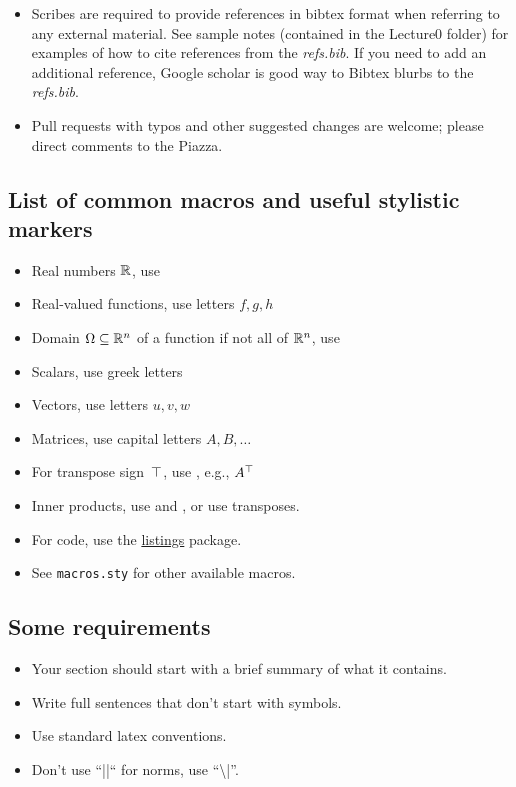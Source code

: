 \documentclass[12pt]{article}
\begin{document}
\begin{itemize}
\item Scribes are required to provide references in bibtex format when referring to any external material. See sample notes (contained in the Lecture0 folder) for examples of how to cite references from the \emph{refs.bib}. If you need to add an additional reference, Google scholar is good way to Bibtex blurbs to the \emph{refs.bib}.
\item Pull requests with typos and other suggested changes are welcome; please direct comments to the Piazza.
\end{itemize}

\subsection*{List of common macros and useful stylistic markers}

\begin{itemize}
\item Real numbers $\mathbb{R}$, use 
\item Real-valued functions, use letters $f, g, h$
\item Domain $\Omega\subseteq\mathbb{R}^n$ of a function if not all of $\mathbb{R}^n$, use 
\item Scalars, use greek letters
\item Vectors, use letters $u, v, w$
\item Matrices, use capital letters $A, B, \dots$
\item For transpose sign~$\top$, use , e.g., $A^\top$
\item Inner products, use  and , or use transposes.
\item For code, use the \href{https://en.wikibooks.org/wiki/LaTeX/Source_Code_Listings}{listings} package.
\item See {\tt macros.sty} for other available macros.

\end{itemize}

\subsection{Some requirements}

\begin{itemize}
\item Your section should start with a brief summary of what it contains.
\item Write full sentences that don't start with symbols.
\item Use standard latex conventions.
\item Don't use ``||`` for norms, use ``\textbackslash |''.
\end{itemize}
\end{document}

